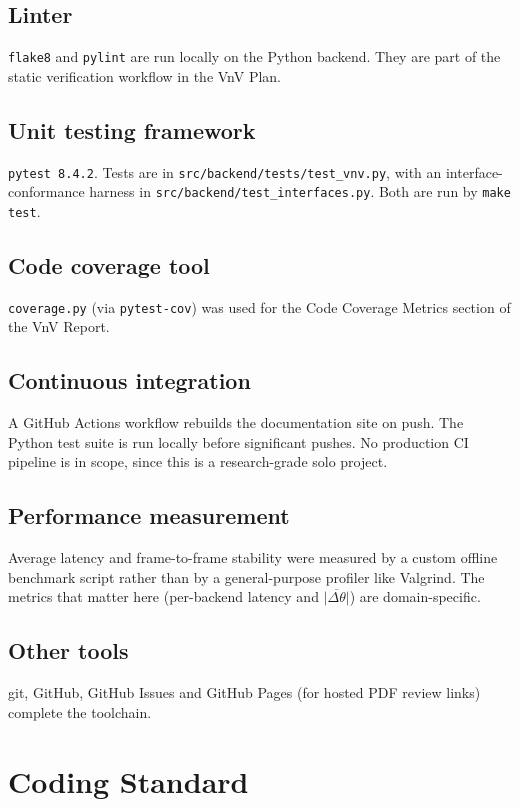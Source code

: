 \documentclass{article}
\begin{document}
\subsection*{Linter}
\texttt{flake8} and \texttt{pylint} are run locally on the Python
backend. They are part of the static verification workflow in the VnV
Plan.

\subsection*{Unit testing framework}
\texttt{pytest 8.4.2}. Tests are in
\texttt{src/backend/tests/test\_vnv.py}, with an interface-conformance
harness in \texttt{src/backend/test\_interfaces.py}. Both are run by
\texttt{make test}.

\subsection*{Code coverage tool}
\texttt{coverage.py} (via \texttt{pytest-cov}) was used for the Code
Coverage Metrics section of the VnV Report.

\subsection*{Continuous integration}
A GitHub Actions workflow rebuilds the documentation site on push.
The Python test suite is run locally before significant pushes. No
production CI pipeline is in scope, since this is a research-grade
solo project.

\subsection*{Performance measurement}
Average latency and frame-to-frame stability were measured by a custom
offline benchmark script rather than by a general-purpose profiler
like Valgrind. The metrics that matter here (per-backend latency and
$\overline{|\Delta\theta|}$) are domain-specific.

\subsection*{Other tools}
git, GitHub, GitHub Issues and GitHub Pages (for hosted PDF review
links) complete the toolchain.

\section{Coding Standard}
\end{document}
